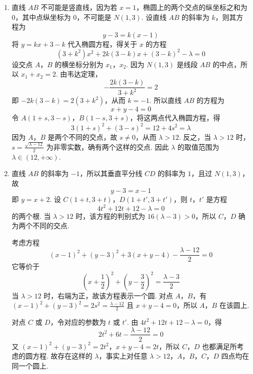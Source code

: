 \begin{solution}
\begin{enumerate}
\item 直线 \(AB\) 不可能是竖直线，因为若 \(x=1\)，椭圆上的两个交点的纵坐标之和为 \(0\)，其中点纵坐标为 \(0\)，不可能是 \(N(1,3)\). 设直线 \(AB\) 的斜率为 \(k\)，则其方程为
\[
y-3=k(x-1)
\]
将 \(y=kx+3-k\) 代入椭圆方程，得关于 \(x\) 的方程
\[
(3+k^2)x^2+2k(3-k)x+(3-k)^2-\lambda=0
\]
设交点 \(A\)，\(B\) 的横坐标分别为 \(x_1\)，\(x_2\). 因为 \(N(1,3)\) 是线段 \(AB\) 的中点，所以 \(x_1+x_2=2\). 由韦达定理，
\[
-\frac{2k(3-k)}{3+k^2}=2
\]
即 \(-2k(3-k)=2(3+k^2)\)，从而 \(k=-1\). 所以直线 \(AB\) 的方程为
\[
x+y-4=0
\]
令 \(A(1+s,3-s)\)，\(B(1-s,3+s)\)，将这两点代入椭圆方程，得
\[
3(1+s)^2+(3-s)^2=12+4s^2=\lambda
\]
因为 \(A\)，\(B\) 是两个不同的交点，故 \(s\ne0\)，从而 \(\lambda>12\). 反之，当 \(\lambda>12\) 时，\(s=\frac{\sqrt{\lambda-12}}2\) 为非零实数，确有两个这样的交点. 因此 \(\lambda\) 的取值范围为 \(\lambda\in(12,+\infty)\).
\item 直线 \(AB\) 的斜率为 \(-1\)，所以其垂直平分线 \(CD\) 的斜率为 \(1\)，且过 \(N(1,3)\)，故
\[
y-3=x-1
\]
即 \(y=x+2\). 设 \(C(1+t,3+t)\)，\(D(1+t',3+t')\)，则 \(t\)，\(t'\) 是方程
\[
4t^2+12t+12-\lambda=0
\]
的两个根. 当 \(\lambda>12\) 时，该方程的判别式为 \(16(\lambda-3)>0\)，所以 \(C\)，\(D\) 确为两个不同的交点.

考虑方程
\[
(x-1)^2+(y-3)^2+3(x+y-4)-\frac{\lambda-12}{2}=0
\]
它等价于
\[
\left(x+\frac{1}{2}\right)^2+\left(y-\frac{3}{2}\right)^2=\frac{\lambda-3}{2}
\]
当 \(\lambda>12\) 时，右端为正，故该方程表示一个圆. 对点 \(A\)，\(B\)，有 \((x-1)^2+(y-3)^2=2s^2=\frac{\lambda-12}{2}\) 且 \(x+y-4=0\)，所以 \(A\)，\(B\) 在该圆上.

对点 \(C\) 或 \(D\)，令对应的参数为 \(t\) 或 \(t'\). 由 \(4t^2+12t+12-\lambda=0\)，得
\[
2t^2+6t-\frac{\lambda-12}{2}=0
\]
又 \((x-1)^2+(y-3)^2=2t^2\)，\(x+y-4=2t\)，所以 \(C\)，\(D\) 也都满足所考虑的圆方程. 故存在这样的 \(\lambda\)，事实上对任意 \(\lambda>12\)，\(A\)，\(B\)，\(C\)，\(D\) 四点均在同一个圆上.
\end{enumerate}
\end{solution}
